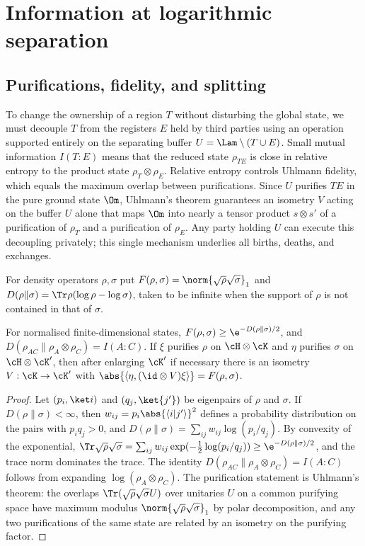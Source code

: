\section{Information at logarithmic separation}\label{sec:logsep}

\subsection{Purifications, fidelity, and splitting}

\begin{inwords}
To change the ownership of a region $T$ without disturbing the global state,
we must decouple $T$ from the registers $E$ held by third parties using an
operation supported entirely on the separating buffer $U=\Lam\setminus(T\cup E)$.
Small mutual information $I(T:E)$ means that the reduced state $\rho_{TE}$
is close in relative entropy to the product state $\rho_T\otimes\rho_E$.
Relative entropy controls Uhlmann fidelity, which equals the maximum overlap
between purifications. Since $U$ purifies $TE$ in the pure ground state
$\Om$, Uhlmann's theorem guarantees an isometry $V$ acting on the buffer
$U$ alone that maps $\Om$ into nearly a tensor product $s\otimes s'$ of a
purification of $\rho_T$ and a purification of $\rho_E$. Any party holding
$U$ can execute this decoupling privately; this single mechanism underlies
all births, deaths, and exchanges.
\end{inwords}

\precisely
For density operators $\rho,\sigma$ put $F(\rho,\sigma)=\norm{\sqrt\rho\sqrt\sigma}_1$
and $D(\rho\|\sigma)=\Tr\rho(\log\rho-\log\sigma)$, taken to be infinite
when the support of $\rho$ is not contained in that of $\sigma$.

\begin{lemma}\label{lem:fidelity}
For normalised finite-dimensional states, $F(\rho,\sigma)\ge\e^{-D(\rho\|\sigma)/2}$,
and $D(\rho_{AC}\|\rho_A\otimes\rho_C)=I(A:C)$. If $\xi$ purifies $\rho$ on
$\cH\otimes\cK$ and $\eta$ purifies $\sigma$ on $\cH\otimes\cK'$, then after
enlarging $\cK'$ if necessary there is an isometry $V:\cK\to\cK'$ with
$\abs{\langle\eta,(\id\otimes V)\xi\rangle}=F(\rho,\sigma)$.
\end{lemma}
\begin{proof}
Let $(p_i,\ket i)$ and $(q_j,\ket{j'})$ be eigenpairs of $\rho$ and $\sigma$.
If $D(\rho\|\sigma)<\infty$, then $w_{ij}=p_i\abs{\langle i|j'\rangle}^2$ defines
a probability distribution on the pairs with $p_iq_j>0$, and
$D(\rho\|\sigma)=\sum_{ij}w_{ij}\log(p_i/q_j)$. By convexity of the exponential,
$\Tr\sqrt\rho\sqrt\sigma=\sum_{ij}w_{ij}\exp(-\tfrac12\log(p_i/q_j))\ge\e^{-D(\rho\|\sigma)/2}$,
and the trace norm dominates the trace. The identity
$D(\rho_{AC}\|\rho_A\otimes\rho_C)=I(A:C)$ follows from expanding
$\log(\rho_A\otimes\rho_C)$. The purification statement is Uhlmann's
theorem: the overlaps $\Tr(\sqrt\rho\sqrt\sigma U)$ over unitaries $U$ on a
common purifying space have maximum modulus $\norm{\sqrt\rho\sqrt\sigma}_1$
by polar decomposition, and any two purifications of the same state are
related by an isometry on the purifying factor.
\end{proof}

